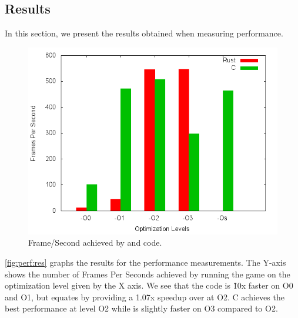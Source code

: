 \begin{description}
    \item[]
\end{description}

\subsection{Results}
\label{sec:perf:res}

In this section, we present the results obtained when measuring performance.

\begin{figure}[H]
  \begin{center}
    \includegraphics[scale=0.5]{results/plots/perf/perf.png}
  \end{center}
  \caption{Frame/Second achieved by {\C} and {\rust} code.}
  \label{fig:perf:res}
\end{figure}

\autoref{fig:perf:res} graphs the results for the performance measurements.
The Y-axis shows the number of Frames Per Seconds achieved by running the game on the optimization level given by the X axis.
We see that the {\C} code is \~10x faster on O0 and O1, but {\rust} equates by providing a 1.07x speedup over {\C} at O2.
C achieves the best performance at level O2 while {\rust} is slightly faster on O3 compared to O2.

